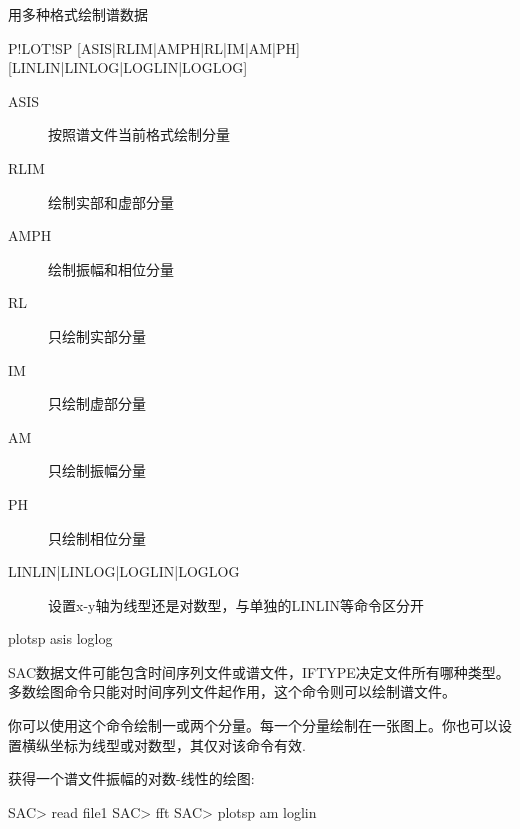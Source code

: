 \label{cmd:plotsp}

用多种格式绘制谱数据

\begin{SACSTX}
P!LOT!SP [ASIS|RLIM|AMPH|RL|IM|AM|PH] [LINLIN|LINLOG|LOGLIN|LOGLOG]
\end{SACSTX}

\begin{description}
\item [ASIS]  按照谱文件当前格式绘制分量
\item [RLIM]  绘制实部和虚部分量
\item [AMPH]  绘制振幅和相位分量
\item [RL] 只绘制实部分量
\item [IM]  只绘制虚部分量
\item [AM]  只绘制振幅分量
\item [PH]  只绘制相位分量
\item [LINLIN|LINLOG|LOGLIN|LOGLOG] 设置x-y轴为线型还是对数型，与单独的LINLIN等命令区分开
\end{description}

\begin{SACDFT}
plotsp asis loglog
\end{SACDFT}

SAC数据文件可能包含时间序列文件或谱文件，IFTYPE决定文件所有哪种类型。多数绘图命令只能对时间序列文件起作用，这个命令则可以绘制谱文件。

你可以使用这个命令绘制一或两个分量。每一个分量绘制在一张图上。你也可以设置横纵坐标为线型或对数型，其仅对该命令有效.

获得一个谱文件振幅的对数-线性的绘图:
\begin{SACCode}
SAC> read file1
SAC> fft
SAC> plotsp am loglin
\end{SACCode}
